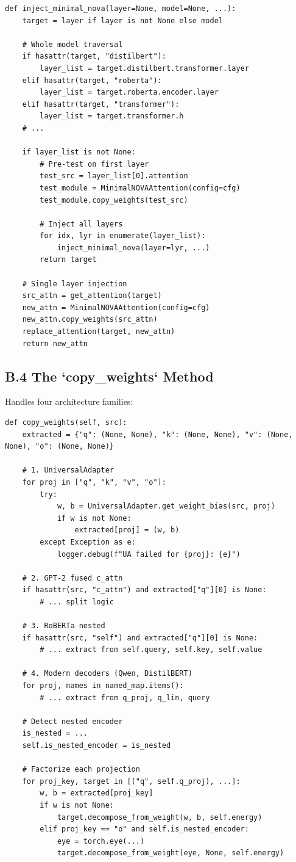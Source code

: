 \begin{lstlisting}
def inject_minimal_nova(layer=None, model=None, ...):
    target = layer if layer is not None else model
    
    # Whole model traversal
    if hasattr(target, "distilbert"):
        layer_list = target.distilbert.transformer.layer
    elif hasattr(target, "roberta"):
        layer_list = target.roberta.encoder.layer
    elif hasattr(target, "transformer"):
        layer_list = target.transformer.h
    # ...
    
    if layer_list is not None:
        # Pre-test on first layer
        test_src = layer_list[0].attention
        test_module = MinimalNOVAAttention(config=cfg)
        test_module.copy_weights(test_src)
        
        # Inject all layers
        for idx, lyr in enumerate(layer_list):
            inject_minimal_nova(layer=lyr, ...)
        return target
    
    # Single layer injection
    src_attn = get_attention(target)
    new_attn = MinimalNOVAAttention(config=cfg)
    new_attn.copy_weights(src_attn)
    replace_attention(target, new_attn)
    return new_attn
\end{lstlisting}

\subsection{B.4 The `copy\_weights` Method}

Handles four architecture families:

\begin{lstlisting}
def copy_weights(self, src):
    extracted = {"q": (None, None), "k": (None, None), "v": (None, None), "o": (None, None)}
    
    # 1. UniversalAdapter
    for proj in ["q", "k", "v", "o"]:
        try:
            w, b = UniversalAdapter.get_weight_bias(src, proj)
            if w is not None:
                extracted[proj] = (w, b)
        except Exception as e:
            logger.debug(f"UA failed for {proj}: {e}")
    
    # 2. GPT-2 fused c_attn
    if hasattr(src, "c_attn") and extracted["q"][0] is None:
        # ... split logic
    
    # 3. RoBERTa nested
    if hasattr(src, "self") and extracted["q"][0] is None:
        # ... extract from self.query, self.key, self.value
    
    # 4. Modern decoders (Qwen, DistilBERT)
    for proj, names in named_map.items():
        # ... extract from q_proj, q_lin, query
    
    # Detect nested encoder
    is_nested = ...
    self.is_nested_encoder = is_nested
    
    # Factorize each projection
    for proj_key, target in [("q", self.q_proj), ...]:
        w, b = extracted[proj_key]
        if w is not None:
            target.decompose_from_weight(w, b, self.energy)
        elif proj_key == "o" and self.is_nested_encoder:
            eye = torch.eye(...)
            target.decompose_from_weight(eye, None, self.energy)
\end{lstlisting}


